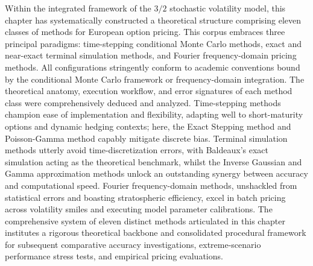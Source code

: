 Within the integrated framework of the $3/2$ stochastic volatility model, this chapter has systematically constructed a theoretical structure comprising eleven classes of methods for European option pricing. This corpus embraces three principal paradigms: time-stepping conditional Monte Carlo methods, exact and near-exact terminal simulation methods, and Fourier frequency-domain pricing methods. All configurations stringently conform to academic conventions bound by the conditional Monte Carlo framework or frequency-domain integration. The theoretical anatomy, execution workflow, and error signatures of each method class were comprehensively deduced and analyzed.
Time-stepping methods champion ease of implementation and flexibility, adapting well to short-maturity options and dynamic hedging contexts; here, the Exact Stepping method and Poisson-Gamma method capably mitigate discrete bias. Terminal simulation methods utterly avoid time-discretization errors, with Baldeaux's exact simulation acting as the theoretical benchmark, whilst the Inverse Gaussian and Gamma approximation methods unlock an outstanding synergy between accuracy and computational speed. Fourier frequency-domain methods, unshackled from statistical errors and boasting stratospheric efficiency, excel in batch pricing across volatility smiles and executing model parameter calibrations. The comprehensive system of eleven distinct methods articulated in this chapter institutes a rigorous theoretical backbone and consolidated procedural framework for subsequent comparative accuracy investigations, extreme-scenario performance stress tests, and empirical pricing evaluations.